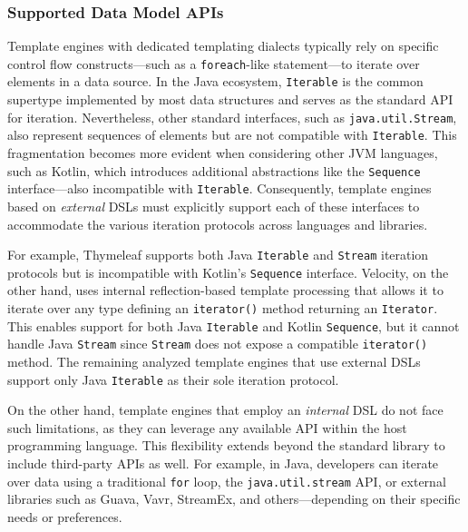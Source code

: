 \documentclass[software,article,accept,pdftex,moreauthors]{Definitions/mdpi}
\begin{document}

\subsubsection{Supported Data Model APIs}\label{s2.1.2}

Template engines with dedicated templating dialects typically rely on specific
control flow constructs---such as a \texttt{foreach}-like statement---to iterate
over elements in a data source. In the Java ecosystem, \texttt{Iterable} is the
common supertype implemented by most data structures and serves as the standard
API for iteration. Nevertheless, other standard interfaces, such as
\texttt{java.util.Stream}, also represent sequences of elements but are not
compatible with \texttt{Iterable}. This fragmentation becomes more evident when
considering other JVM languages, such as Kotlin, which introduces additional
abstractions like the \texttt{Sequence} interface---also incompatible with
\texttt{Iterable}. Consequently, template engines based on \textit{external}
DSLs must explicitly support each of these interfaces to accommodate the
various iteration protocols across languages and libraries.

For example, Thymeleaf supports both Java \texttt{Iterable} and \texttt{Stream}
iteration protocols but is incompatible with Kotlin's \texttt{Sequence}
interface.
Velocity, on the other hand, uses internal reflection-based template processing
that allows it to iterate over any type defining an \texttt{iterator()} method
returning an \texttt{Iterator}. This enables support for both Java
\texttt{Iterable} and Kotlin \texttt{Sequence}, but it cannot handle Java
\texttt{Stream} since \texttt{Stream} does not expose a compatible
\texttt{iterator()} method.
The remaining analyzed template engines that use external DSLs support only Java
\texttt{Iterable} as their sole iteration protocol.

On the other hand, template engines that employ an \textit{internal} DSL do not
face such limitations, as they can leverage any available API within the host
programming language. This flexibility extends beyond the standard library to
include third-party APIs as well. For example, in Java, developers can iterate
over data using a traditional \texttt{for} loop, the \texttt{java.util.stream}
API, or external libraries such as Guava, Vavr, StreamEx, and \mbox{others---depending}
on their specific needs or preferences.
\end{document}

